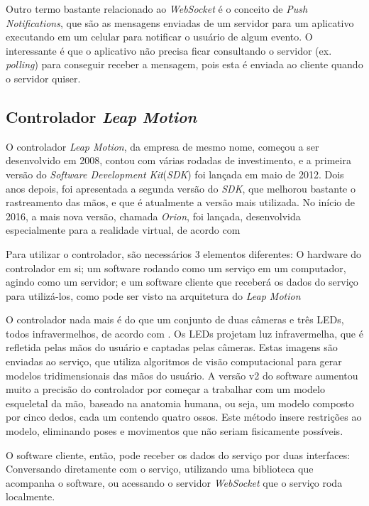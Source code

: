 Outro termo bastante relacionado ao \textit{WebSocket} é o conceito de 
\textit{Push Notifications}, que são as mensagens enviadas de um servidor para 
um aplicativo executando em um celular para notificar o usuário de algum evento. 
O interessante é que o aplicativo não precisa ficar consultando o servidor 
(ex. \textit{polling}) para conseguir receber a mensagem, pois esta é enviada 
ao cliente quando o servidor quiser.

\subsection{Controlador \textit{Leap Motion}}\label{subsec-teo-leap-motion}

O controlador \textit{Leap Motion}, da empresa de mesmo nome, começou a ser desenvolvido 
em 2008, contou com várias rodadas de investimento, e a primeira versão do 
\textit{Software Development Kit}(\textit{SDK}) foi lançada em maio de 2012. Dois anos depois, foi 
apresentada a segunda versão do \textit{SDK}, que melhorou bastante o rastreamento das 
mãos, e que é atualmente a versão mais utilizada. No início de 2016, a mais 
nova versão, chamada \textit{Orion}, foi lançada, desenvolvida especialmente para a 
realidade virtual, de acordo com \cite{leap:2016:changeset}

Para utilizar o controlador, são necessários 3 elementos diferentes: O hardware 
do controlador em si; um software rodando como um serviço em um computador, agindo como um servidor; 
e um software cliente que receberá os dados do serviço para utilizá-los, 
como pode ser visto na arquitetura do \textit{Leap Motion} \cite{leap:2016:architecture}

O controlador nada mais é do que um conjunto de duas câmeras e três LEDs, todos 
infravermelhos, de acordo com \cite{leap:2016:how-it-works}. Os LEDs projetam
luz infravermelha, que é refletida pelas mãos do usuário e captadas 
pelas câmeras. Estas imagens são enviadas ao serviço, 
que utiliza algoritmos de visão computacional para gerar modelos tridimensionais 
das mãos do usuário. A versão v2 do software aumentou muito a precisão do 
controlador por começar a trabalhar com um modelo esqueletal da mão, baseado 
na anatomia humana, ou seja, um modelo composto por cinco dedos, cada um contendo 
quatro ossos. Este método insere restrições ao modelo, eliminando poses e movimentos 
que não seriam fisicamente possíveis.

O software cliente, então, pode receber os dados do serviço por duas interfaces:
Conversando diretamente com o serviço, utilizando uma biblioteca que acompanha o software, 
ou acessando o servidor \textit{WebSocket} que o serviço roda localmente.

